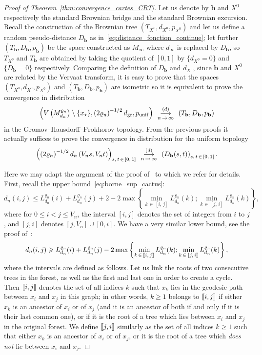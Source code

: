 \documentclass[AHL,Unicode,longabstracts,published]{cedram}
\newcommand{\llbracket}{\mathopen{[\mkern -2.7mu[}}
\newcommand{\rrbracket}{\mathclose{]\mkern -2.7mu]}}
\newcommand{\1}{\ensembles{1}}
\newcommand{\bb}{\mathbf{b}}
\renewcommand{\le}{\leqslant}
\renewcommand{\ge}{\geqslant}
\newcommand{\CRT}{T}
\newcommand{\dCRT}{d}
\newcommand{\pCRT}{p}
\newcommand{\mn}{M_{d_n}^{\varrho_n}}
\newcommand{\dgr}{d_{\mathrm{gr}}}
\newcommand{\pgr}{p_{\mathrm{unif}}}
\newcommand{\Lfn}{L_{d_n}^{\varrho_n}}
\newcommand{\vertices}{V}
\newcommand{\cvloi}[1][n]{\enskip\mathop{\longrightarrow}^{(d)}_{#1\,\to\, \infty}\enskip}
\begin{document}
\begin{proof}[Proof of Theorem~\ref{thm:convergence_cartes_CRT}]
Let us denote by $\bb$ and $X^0$ respectively the standard Brownian bridge and the standard Brownian excursion. Recall the construction of the Brownian tree $(\CRT_{X^0}, \dCRT_{X^0}, \pCRT_{X^0})$ and let us define a random pseudo-distance $D_{\bb}$ as in~\eqref{eq:distance_fonction_continue}; let further $(\CRT_{\bb}, D_{\bb}, p_{\bb})$ be the space constructed as $M_\infty$ where $d_\infty$ is replaced by $D_{\bb}$, so $\CRT_{X^0}$ and $\CRT_{\bb}$ are obtained by taking the quotient of $[0,1]$ by $\{\dCRT_{X^0} = 0\}$ and $\{D_{\bb} = 0\}$ respectively. Comparing the definition of $D_{\bb}$ and $\dCRT_{X^0}$, since $\bb$ and $X^0$ are related by the Vervaat transform, it is easy to prove that the spaces $(\CRT_{X^0}, \dCRT_{X^0}, \pCRT_{X^0})$ and $(\CRT_{\bb}, D_{\bb}, p_{\bb})$ are isometric so it is equivalent to prove the convergence in distribution
\[
\left(V\left(\mn\right)\setminus\{x_\star\}, \left(2\varrho_n\right)^{-1/2} \dgr, \pgr\right) \cvloi \left(\CRT_{\bb}, D_{\bb}, p_{\bb}\right)
\]
in the Gromov--Hausdorff--Prokhorov topology. From the previous proofs it actually suffices to prove the convergence in distribution for the uniform topology
\begin{equation}\label{eq:cv_distance_carte_arbre}
\left(\left(2\varrho_n\right)^{-1/2} d_n\left(\vertices_n s, \vertices_n t\right)\right)_{s,\,t \,\in\,[0,\,1]} \cvloi \left(D_{\bb}(s,t)\right)_{s,\,t \,\in\,[0,\,1]}.
\end{equation}

Here we may adapt the argument of the proof of~\cite[Theorem~5]{Bet15} to which we refer for details. First, recall the upper bound~\eqref{eq:borne_sup_cactus}:
\[
d_n(i,j) \le \Lfn(i) + \Lfn(j) + 2 - 2 \max\left\{\min_{k\,\in\,[i,\,j]} \Lfn(k); \min_{k\,\in\,[j,\,i]} \Lfn(k)\right\},
\]
where for $0 \le i < j \le \vertices_n$, the interval $[i, j]$ denotes the set of integers from $i$ to $j$, and $[j,i]$ denotes $[j, \vertices_n] \cup [0, i]$. We have a very similar lower bound, see the proof of~\cite[Corollary~4.4]{CLGM13}:
\begin{equation}\label{eq:borne_inf_cactus}
d_n(i,j) \ge \Lfn(i) + \Lfn(j) - 2 \max\left\{\min_{k \,\in\,\llbracket i,\,j\rrbracket} \Lfn(k); \min_{k\,\in \,\llbracket j,\,i\rrbracket} \Lfn(k)\right\},
\end{equation}
where the intervals are defined as follows. Let us link the roots of two consecutive trees in the forest, as well as the first and last one in order to create a cycle. Then $\llbracket i, j\rrbracket$ denotes the set of all indices $k$ such that $x_k$ lies in the geodesic path between $x_i$ and $x_j$ in this graph; in other words, $k \ge 1$ belongs to $\llbracket i, j\rrbracket$ if either $x_k$ is an ancestor of $x_i$ or of $x_j$ (and it is an ancestor of both if and only if it is their last common one), or if it is the root of a tree which lies between $x_i$ and $x_j$ in the original forest. We define $\llbracket j, i \rrbracket$ similarly as the set of all indices $k \ge 1$ such that either $x_k$ is an ancestor of $x_i$ or of $x_j$, or it is the root of a tree which \emph{does not} lie between $x_i$ and $x_j$.



\end{proof}
\end{document}
